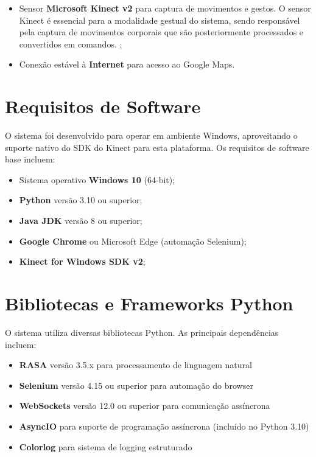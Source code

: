 \documentclass{report}
\begin{document}
\begin{itemize}
    \item Sensor \textbf{Microsoft Kinect v2} para captura de movimentos e gestos. O sensor Kinect é essencial para a modalidade gestual do sistema, sendo responsável pela captura de movimentos corporais que são posteriormente processados e convertidos em comandos. ;
    \item Conexão estável à \textbf{Internet} para acesso ao Google Maps.
\end{itemize}

\section{Requisitos de Software}

O sistema foi desenvolvido para operar em ambiente Windows, aproveitando o suporte nativo do SDK do Kinect para esta plataforma. Os requisitos de software base incluem:

\begin{itemize}
    \item Sistema operativo \textbf{Windows 10} (64-bit);
    \item \textbf{Python} versão 3.10 ou superior;
    \item \textbf{Java JDK} versão 8 ou superior;
    \item \textbf{Google Chrome} ou Microsoft Edge (automação Selenium);
    \item \textbf{Kinect for Windows SDK v2};
\end{itemize}

\section{Bibliotecas e Frameworks Python}

O sistema utiliza diversas bibliotecas Python. As principais dependências incluem:

\begin{itemize}
    \item \textbf{RASA} versão 3.5.x para processamento de linguagem natural
    \item \textbf{Selenium} versão 4.15 ou superior para automação do browser
    \item \textbf{WebSockets} versão 12.0 ou superior para comunicação assíncrona
    \item \textbf{AsyncIO} para suporte de programação assíncrona (incluído no Python 3.10)
    \item \textbf{Colorlog} para sistema de logging estruturado
\end{itemize}
\end{document}
